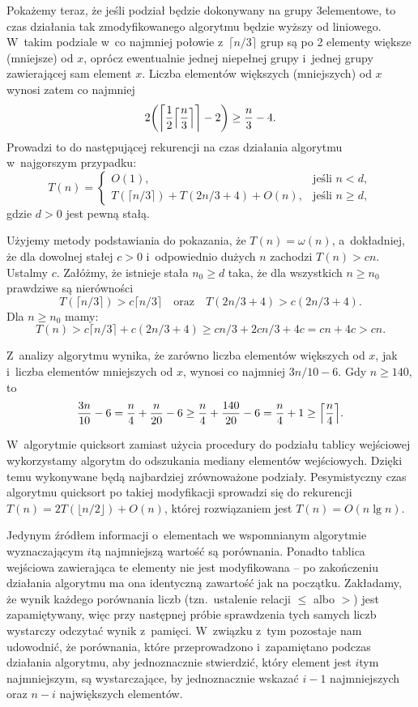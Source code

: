 Pokażemy teraz, że jeśli podział będzie dokonywany na grupy 3\nbhyphen elementowe, to czas działania tak zmodyfikowanego algorytmu  będzie wyższy od liniowego.
W~takim podziale w~co najmniej połowie z~$\lceil n/3\rceil$ grup są po 2 elementy większe (mniejsze) od $x$, oprócz ewentualnie jednej niepełnej grupy i~jednej grupy zawierającej sam element $x$.
Liczba elementów większych (mniejszych) od $x$ wynosi zatem co najmniej
\[
	2\biggl(\biggl\lceil\frac{1}{2}\Bigl\lceil\frac{n}{3}\Bigr\rceil\biggr\rceil-2\biggr) \ge \frac{n}{3}-4.
\]
Prowadzi to do następującej rekurencji na czas działania algorytmu w~najgorszym przypadku:
\[
	T(n) = \begin{cases}
		O(1), & \text{jeśli $n<d$}, \\
		T(\lceil n/3\rceil)+T(2n/3+4)+O(n), & \text{jeśli $n\ge d$},
	\end{cases}
\]
gdzie $d>0$ jest pewną stałą.

Użyjemy metody podstawiania do pokazania, że $T(n)=\omega(n)$, a~dokładniej, że dla dowolnej stałej $c>0$ i~odpowiednio dużych $n$ zachodzi $T(n)>cn$.
Ustalmy $c$.
Załóżmy, że istnieje stała $n_0\ge d$ taka, że dla wszystkich $n\ge n_0$ prawdziwe są nierówności
\[
	T(\lceil n/3\rceil) > c\lceil n/3\rceil \quad\text{oraz}\quad T(2n/3+4) > c(2n/3+4).
\]
Dla $n\ge n_0$ mamy:
\[
	T(n) > c\lceil n/3\rceil+c(2n/3+4) \ge cn/3+2cn/3+4c = cn+4c > cn.
\]

\exercise %
Z~analizy algorytmu  wynika, że zarówno liczba elementów większych od $x$, jak i~liczba elementów mniejszych od $x$, wynosi co najmniej $3n/10-6$.
Gdy $n\ge140$, to
\[
	\frac{3n}{10}-6 = \frac{n}{4}+\frac{n}{20}-6 \ge \frac{n}{4}+\frac{140}{20}-6 = \frac{n}{4}+1 \ge \Bigl\lceil\frac{n}{4}\Bigr\rceil.
\]

\exercise %

\noindent W~algorytmie quicksort zamiast użycia procedury  do podziału tablicy wejściowej wykorzystamy algorytm  do odszukania mediany elementów wejściowych.
Dzięki temu wykonywane będą najbardziej zrównoważone podziały.
Pesymistyczny czas algorytmu quicksort po takiej modyfikacji sprowadzi się do rekurencji $T(n)=2T(\lfloor n/2\rfloor)+O(n)$, której rozwiązaniem jest $T(n)=O(n\lg n)$.

\exercise %
Jedynym źródłem informacji o~elementach we wspomnianym algorytmie wyznaczającym $i$\nbhyphen tą najmniejszą wartość są porównania.
Ponadto tablica wejściowa zawierająca te elementy nie jest modyfikowana -- po zakończeniu działania algorytmu ma ona identyczną zawartość jak na początku.
Zakładamy, że wynik każdego porównania liczb (tzn.\ ustalenie relacji $\le$ albo $>$) jest zapamiętywany, więc przy następnej próbie sprawdzenia tych samych liczb wystarczy odczytać wynik z~pamięci.
W~związku z~tym pozostaje nam udowodnić, że porównania, które przeprowadzono i~zapamiętano podczas działania algorytmu, aby jednoznacznie stwierdzić, który element jest $i$\nbhyphen tym najmniejszym, są wystarczające, by jednoznacznie wskazać $i-1$ najmniejszych oraz $n-i$ największych elementów.

